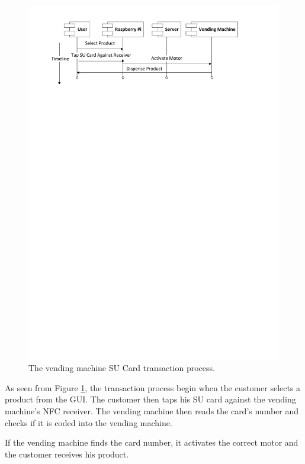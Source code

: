 \begin{figure}
 \centering 
 \includegraphics[clip=true, trim = 0 650 0 0,
 scale=0.7]{su_card_transaction_processflow}
 \caption{The vending machine SU Card transaction process.}
 \label{fig:vm_su_interaction}
\end{figure}

As seen from Figure \ref{fig:vm_su_interaction}, the transaction process begin when the
customer selects a product from the GUI. The customer then taps his SU card against the
vending machine's NFC receiver. The vending machine then reads the card's number
and checks if it is coded into the vending machine. 

If the vending machine finds the card number, it activates the correct motor and
the customer receives his product.
